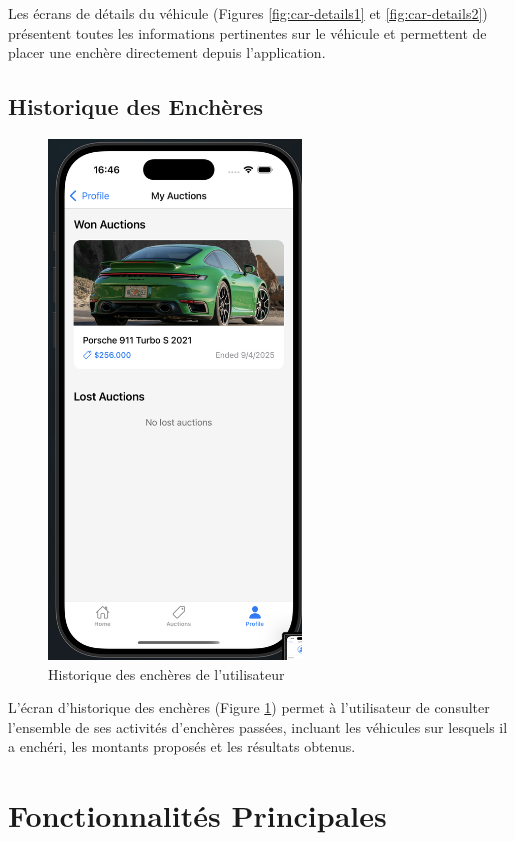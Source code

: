 Les écrans de détails du véhicule (Figures \ref{fig:car-details1} et \ref{fig:car-details2}) présentent toutes les informations pertinentes sur le véhicule et permettent de placer une enchère directement depuis l'application.

\subsection{Historique des Enchères}

\begin{figure}[H]
    \centering
    \includegraphics[width=0.6\textwidth]{images/auctions history.png}
    \caption{Historique des enchères de l'utilisateur}
    \label{fig:auction-history}
\end{figure}

L'écran d'historique des enchères (Figure \ref{fig:auction-history}) permet à l'utilisateur de consulter l'ensemble de ses activités d'enchères passées, incluant les véhicules sur lesquels il a enchéri, les montants proposés et les résultats obtenus.

\section{Fonctionnalités Principales}

